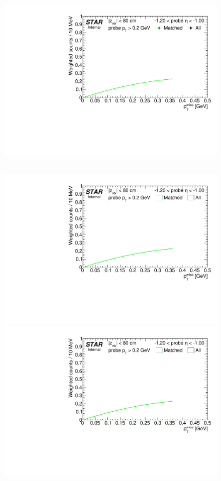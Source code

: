 \begin{figure}[ht]
{  \includegraphics[width=\linewidth,page=9]{graphics/correctionsToEff/TOF_tagAndProbe/Fitting_effVsEta_data.CPT.pdf}
}~
\parbox{0.495\textwidth}{
  \centering
  \includegraphics[width=\linewidth,page=6]{graphics/correctionsToEff/TOF_tagAndProbe/Fitting_effVsEta_mc.CPT.pdf}\\
  \includegraphics[width=\linewidth,page=7]{graphics/correctionsToEff/TOF_tagAndProbe/Fitting_effVsEta_mc.CPT.pdf}\\
}
\end{figure}
